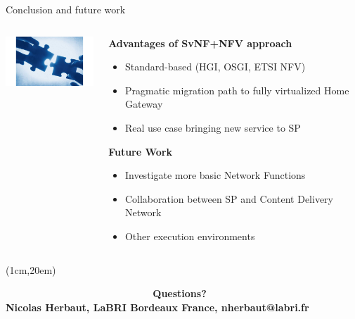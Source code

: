 \documentclass[a4paper]{beamer}
\begin{document}
\begin{frame}{Conclusion and future work}
	\begin{columns}[T]
		\begin{column}[T]{0.33 \textwidth} 
			\vspace{5em}
			\includegraphics[width=10em]{conclusion.jpg}
		\end{column}
										
		\begin{column}[T]{0.66\textwidth} 
										   
			\textbf{Advantages of SvNF+NFV approach}
			\begin{itemize}
				\item Standard-based (HGI, OSGI, ETSI NFV)
				\item Pragmatic migration path to fully virtualized Home Gateway
				\item Real use case bringing new service to SP
			\end{itemize}
			\vspace{3mm}
			\textbf{Future Work}
			\begin{itemize}
				\item Investigate more basic Network Functions
				\item Collaboration between SP and Content Delivery Network
				\item Other execution environments
			\end{itemize}
																																						
		\end{column}
																										
	\end{columns}
	
	
	\pause
	
			\begin{textblock*}{11cm}(1cm,20em)
		\begin{block}
		
			\textbf{ ~~~~~~~~~~~~~~~~~~~~~~~~~~Questions? \\Nicolas Herbaut, LaBRI Bordeaux France, nherbaut@labri.fr}
			
		\end{block}
	\end{textblock*}	
	
\end{frame}
\end{document}
